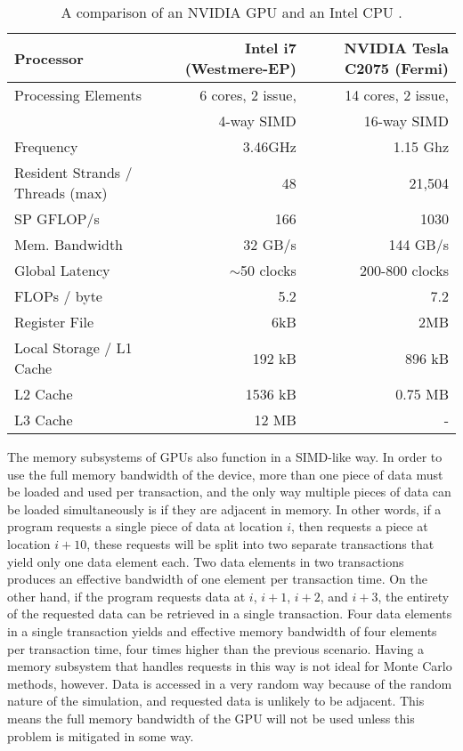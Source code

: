 \begin{table}[h]
\centering
\caption{A comparison of an NVIDIA GPU and an Intel CPU \cite{cent, cpu_latency,opteronperformance}.}
\label{gpu_cpu_comp}
\begin{tabular}{| l | r | r |}
\hline
Processor & Intel i7 (Westmere-EP) & NVIDIA Tesla C2075 (Fermi) \\
\hline
\hline
Processing Elements & 6 cores, 2 issue, & 14 cores, 2 issue, \\
& 4-way SIMD &  16-way SIMD  \\
\hline
Frequency & 3.46GHz &  1.15 Ghz \\
\hline
Resident Strands / Threads (max) & 48 & 21,504 \\
\hline
SP GFLOP/s & 166 & 1030 \\
\hline
Mem. Bandwidth &  32 GB/s & 144 GB/s \\
\hline
Global Latency & $\sim$50 clocks & 200-800 clocks  \\
\hline
FLOPs / byte & 5.2  & 7.2 \\
\hline
Register File & 6kB & 2MB \\
\hline
Local Storage / L1 Cache & 192 kB & 896 kB \\
\hline
L2 Cache & 1536 kB & 0.75 MB \\
\hline
L3 Cache & 12 MB & - \\
\hline
\end{tabular}
\end{table}

The memory subsystems of GPUs also function in a SIMD-like way.  In order to use the full memory bandwidth of the device, more than one piece of data must be loaded and used per transaction, and the only way multiple pieces of data can be loaded simultaneously is if they are adjacent in memory.  In other words, if a program requests a single piece of data at location $i$, then requests a piece at location $i+10$, these requests will be split into two separate transactions that yield only one data element each.  Two data elements in two transactions produces an effective bandwidth of one element per transaction time.   On the other hand, if the program requests data at $i$, $i+1$, $i+2$, and $i+3$, the entirety of the requested data can be retrieved in a single transaction.  Four data elements in a single transaction yields and effective memory bandwidth of four elements per transaction time, four times higher than the previous scenario.  Having a memory subsystem that handles requests in this way is not ideal for Monte Carlo methods, however.  Data is accessed in a very random way because of the random nature of the simulation, and requested data is unlikely to be adjacent.  This means the full memory bandwidth of the GPU will not be used unless this problem is mitigated in some way.

